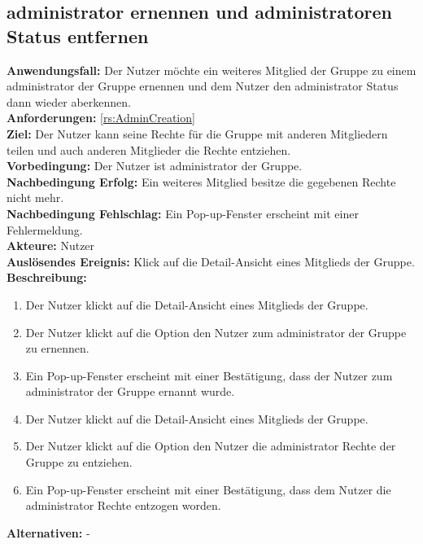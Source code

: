 \documentclass[parskip=full]{scrartcl}
\begin{document}
\subsection{\Gls{administrator} ernennen und \Gls{administrator}en Status entfernen}
\textbf{Anwendungsfall:} Der Nutzer möchte ein weiteres Mitglied der Gruppe zu einem \Gls{administrator} der Gruppe ernennen und dem Nutzer den \Gls{administrator} Status dann wieder aberkennen.\\
\textbf{Anforderungen:} \ref{rs:AdminCreation}\\
\textbf{Ziel:} Der Nutzer kann seine Rechte für die Gruppe mit anderen Mitgliedern teilen und auch anderen Mitglieder die Rechte entziehen.\\
\textbf{Vorbedingung:} Der Nutzer ist \Gls{administrator} der Gruppe.\\
\textbf{Nachbedingung Erfolg:} Ein weiteres Mitglied besitze die gegebenen Rechte nicht mehr.\\
\textbf{Nachbedingung Fehlschlag:} Ein Pop-up-Fenster erscheint mit einer Fehlermeldung.\\
\textbf{Akteure:} Nutzer \\
\textbf{Auslösendes Ereignis:} Klick auf die Detail-Ansicht eines Mitglieds der Gruppe.\\
\textbf{Beschreibung:}
\begin{enumerate}
    \item Der Nutzer klickt auf die Detail-Ansicht eines Mitglieds der Gruppe.
    \item Der Nutzer klickt auf die Option den Nutzer zum \Gls{administrator} der Gruppe zu ernennen.
    \item Ein Pop-up-Fenster erscheint mit einer Bestätigung, dass der Nutzer zum \Gls{administrator} der Gruppe ernannt wurde.
    \item Der Nutzer klickt auf die Detail-Ansicht eines Mitglieds der Gruppe.
    \item Der Nutzer klickt auf die Option den Nutzer die \Gls{administrator} Rechte der Gruppe zu entziehen.
    \item Ein Pop-up-Fenster erscheint mit einer Bestätigung, dass dem Nutzer die \Gls{administrator} Rechte entzogen worden.
\end{enumerate}
\textbf{Alternativen:} -
\newpage
\end{document}
